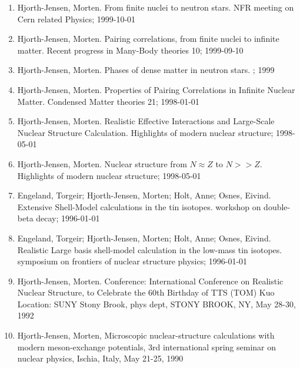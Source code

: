 \documentclass[%
oneside,                 %
final,                   %
10pt]{article}
\begin{document}
\begin{enumerate}
\item Hjorth-Jensen, Morten. From finite nuclei to neutron stars. NFR meeting on Cern related Physics; 1999-10-01

\item Hjorth-Jensen, Morten. Pairing correlations, from finite nuclei to infinite matter. Recent progress in Many-Body theories 10; 1999-09-10

\item Hjorth-Jensen, Morten.  Phases of dense matter in neutron stars. ; 1999

\item Hjorth-Jensen, Morten. Properties of Pairing Correlations in Infinite Nuclear Matter. Condensed Matter theories 21; 1998-01-01

\item Hjorth-Jensen, Morten.  Realistic Effective Interactions and Large-Scale Nuclear Structure Calculation. Highlights of modern nuclear structure; 1998-05-01

\item Hjorth-Jensen, Morten. Nuclear structure from $N\approx Z$ to $N >>Z$. Highlights of modern nuclear structure; 1998-05-01

\item Engeland, Torgeir; Hjorth-Jensen, Morten; Holt, Anne; Osnes, Eivind. Extensive Shell-Model calculations in the tin isotopes. workshop on double-beta decay; 1996-01-01

\item Engeland, Torgeir; Hjorth-Jensen, Morten; Holt, Anne; Osnes, Eivind. Realistic Large basis shell-model calculation in the low-mass tin isotopes. symposium on frontiers of nuclear structure physics; 1996-01-01

\item Hjorth-Jensen, Morten.  Conference: International Conference on Realistic Nuclear Structure, to Celebrate the 60th Birthday of TTS (TOM) Kuo Location: SUNY Stony Brook, phys dept, STONY BROOK, NY, May 28-30, 1992

\item Hjorth-Jensen, Morten,  Microscopic nuclear-structure calculations with modern meson-exchange potentials, 3rd international spring seminar on nuclear physics, Ischia, Italy, May 21-25, 1990
\end{enumerate}

\noindent
\end{document}
